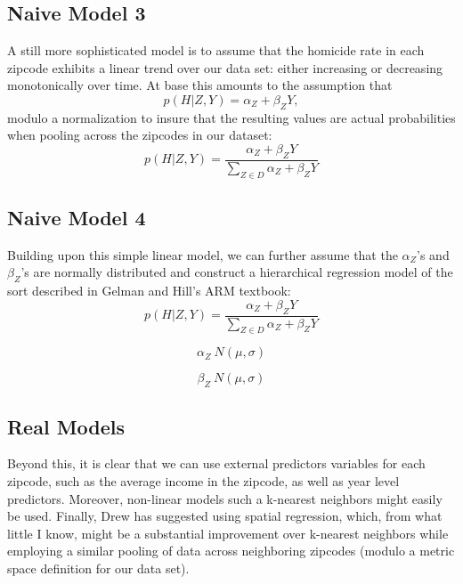 \documentclass[11pt]{amsart}
\begin{document}
\subsection{Naive Model 3}
A still more sophisticated model is to assume that the homicide rate in each zipcode exhibits a linear trend over our data set: either increasing or decreasing monotonically over time. At base this amounts to the assumption that
\[
p(H | Z, Y) = \alpha_{Z} + \beta_{Z} Y,
\]
modulo a normalization to insure that the resulting values are actual probabilities when pooling across the zipcodes in our dataset:
\[
p(H | Z, Y) = \frac{\alpha_{Z} + \beta_{Z} Y}{\sum_{Z \in D} \alpha_{Z} + \beta_{Z} Y}
\]

\subsection{Naive Model 4}
Building upon this simple linear model, we can further assume that the $\alpha_Z$'s and $\beta_Z$'s are normally distributed and construct a hierarchical regression model of the sort described in Gelman and Hill's ARM textbook:
\[
p(H | Z, Y) = \frac{\alpha_{Z} + \beta_{Z} Y}{\sum_{Z \in D} \alpha_{Z} + \beta_{Z} Y}
\]

\[
\alpha_{Z} ~ N(\mu, \sigma)
\]


\[
\beta_{Z} ~ N(\mu, \sigma)
\]

\subsection{Real Models}
Beyond this, it is clear that we can use external predictors variables for each zipcode, such as the average income in the zipcode, as well as year level predictors. Moreover, non-linear models such a k-nearest neighbors might easily be used. Finally, Drew has suggested using spatial regression, which, from what little I know, might be a substantial improvement over k-nearest neighbors while employing a similar pooling of data across neighboring zipcodes (modulo a metric space definition for our data set).
\end{document}
